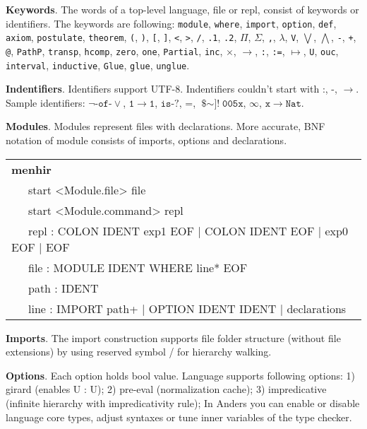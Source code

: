 \documentclass[a4paper,UKenglish,cleveref, autoref, thm-restate]{lipics-v2021}
\newcommand{\tabstyle}[0]{\scriptsize\ttfamily\fontseries{l}\selectfont}
\begin{document}
\textbf{Keywords}. The words of a top-level language, file or repl, consist of keywords or identifiers.
The keywords are following: \texttt{module}, \texttt{where}, \texttt{import}, \texttt{option}, \texttt{def}, \texttt{axiom},
\texttt{postulate}, \texttt{theorem}, \texttt{(}, \texttt{)}, \texttt{[}, \texttt{]}, \texttt{<}, \texttt{>},
\texttt{/}, \texttt{.1}, \texttt{.2}, \texttt{$\Pi$}, \texttt{$\Sigma$}, \texttt{,}, \texttt{$\lambda$},
\texttt{V}, \texttt{$\bigvee$}, \texttt{$\bigwedge$}, \texttt{-}, \texttt{+}, \texttt{@}, \texttt{PathP},
\texttt{transp}, \texttt{hcomp}, \texttt{zero}, \texttt{one}, \texttt{Partial}, \texttt{inc},
\texttt{$\times$}, \texttt{$\rightarrow$}, \texttt{:}, \texttt{:=}, \texttt{$\mapsto$}, \texttt{U},
\texttt{ouc}, \texttt{interval}, \texttt{inductive}, \texttt{Glue}, \texttt{glue}, \texttt{unglue}.

\textbf{Indentifiers}. Identifiers support UTF-8. Indentifiers couldn't
start with $\texttt{:}$, $\texttt{-}$, $\rightarrow$. Sample identifiers:
$\neg\texttt{-of-}\vee$, $\texttt{1}$$\rightarrow$$\texttt{1}$, $\texttt{is-?}$,
$\texttt{=}$, $\texttt{\$$\sim$]!}$$\texttt{005x}$, $\infty$, $\texttt{x}$$\rightarrow$$\texttt{Nat}$.

\textbf{Modules}. Modules represent files with declarations. More accurate, BNF notation of module consists of imports, options and declarations.
\begin{table}[ht]
\tabstyle
\begin{tabular}{l}
\textbf{menhir} \\
\ \ \ start <Module.file> file \\
\ \ \ start <Module.command> repl \\
\ \ \ repl : COLON IDENT exp1 EOF | COLON IDENT EOF | exp0 EOF | EOF \\
\ \ \ file : MODULE IDENT WHERE line* EOF \\
\ \ \ path : IDENT \\
\ \ \ line : IMPORT path+ | OPTION IDENT IDENT | declarations \\
\end{tabular}
\end{table}

\textbf{Imports}. The import construction supports file folder structure (without file extensions)
by using reserved symbol / for hierarchy walking.

\textbf{Options}. Each option holds bool value. Language supports following options:
1) girard (enables U : U);
2) pre-eval (normalization cache);
3) impredicative (infinite hierarchy with impredicativity rule);
In Anders you can enable or disable language core types, adjust syntaxes or
tune inner variables of the type checker.
\end{document}
